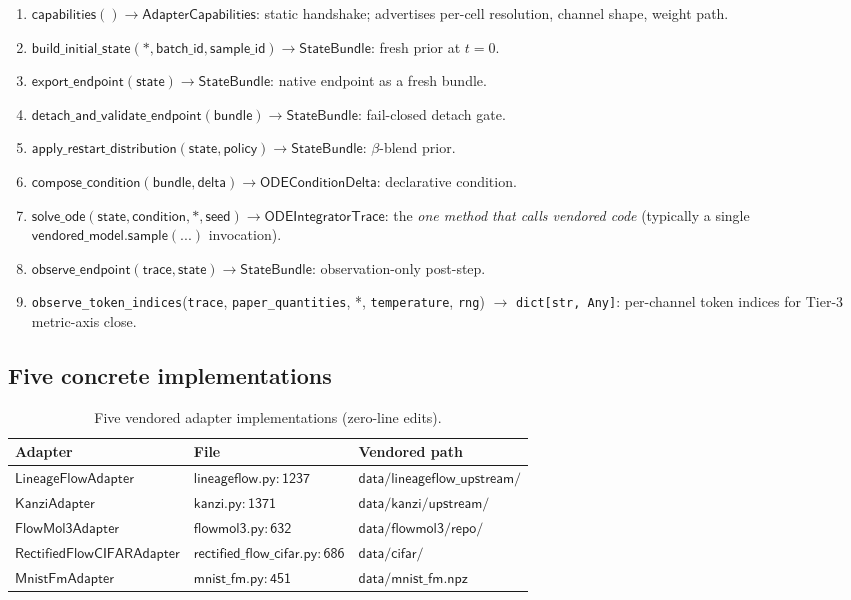 \documentclass[journal,twocolumn,final]{IEEEtran}
\begin{document}
\begin{enumerate}
\item $\mathsf{capabilities}() \to \mathsf{AdapterCapabilities}$: static
handshake; advertises per-cell resolution, channel shape, weight path.
\item $\mathsf{build\_initial\_state}(*, \mathsf{batch\_id}, \mathsf{sample\_id})
\to \mathsf{StateBundle}$: fresh prior at $t=0$.
\item $\mathsf{export\_endpoint}(\mathsf{state}) \to \mathsf{StateBundle}$:
native endpoint as a fresh bundle.
\item $\mathsf{detach\_and\_validate\_endpoint}(\mathsf{bundle}) \to
\mathsf{StateBundle}$: fail-closed detach gate.
\item $\mathsf{apply\_restart\_distribution}(\mathsf{state}, \mathsf{policy})
\to \mathsf{StateBundle}$: $\beta$-blend prior.
\item $\mathsf{compose\_condition}(\mathsf{bundle}, \mathsf{delta}) \to
\mathsf{ODEConditionDelta}$: declarative condition.
\item $\mathsf{solve\_ode}(\mathsf{state}, \mathsf{condition}, *, \mathsf{seed})
\to \mathsf{ODEIntegratorTrace}$: the \emph{one method that calls vendored
code} (typically a single $\mathsf{vendored\_model.sample(...)}$ invocation).
\item $\mathsf{observe\_endpoint}(\mathsf{trace}, \mathsf{state}) \to
\mathsf{StateBundle}$: observation-only post-step.
\item \texttt{observe\_token\_indices}(\texttt{trace},
  \texttt{paper\_quantities}, *, \texttt{temperature}, \texttt{rng}) $\to$
  \texttt{dict[str, Any]}: per-channel token indices for Tier-3 metric-axis
  close.
\end{enumerate}

\subsection{Five concrete implementations}

\begin{table}[ht]
\centering
\caption{Five vendored adapter implementations (zero-line edits).}
\label{tab:adapters}
\scriptsize
\begin{tabular}{lll}
\toprule
\textbf{Adapter} & \textbf{File} & \textbf{Vendored path} \\
\midrule
$\mathsf{LineageFlowAdapter}$ &
  $\mathsf{lineageflow.py:1237}$ &
  $\mathsf{data/lineageflow\_upstream/}$ \\
$\mathsf{KanziAdapter}$ &
  $\mathsf{kanzi.py:1371}$ &
  $\mathsf{data/kanzi/upstream/}$ \\
$\mathsf{FlowMol3Adapter}$ &
  $\mathsf{flowmol3.py:632}$ &
  $\mathsf{data/flowmol3/repo/}$ \\
$\mathsf{RectifiedFlowCIFARAdapter}$ &
  $\mathsf{rectified\_flow\_cifar.py:686}$ &
  $\mathsf{data/cifar/}$ \\
$\mathsf{MnistFmAdapter}$ &
  $\mathsf{mnist\_fm.py:451}$ &
  $\mathsf{data/mnist\_fm.npz}$ \\
\bottomrule
\end{tabular}
\end{table}
\end{document}
